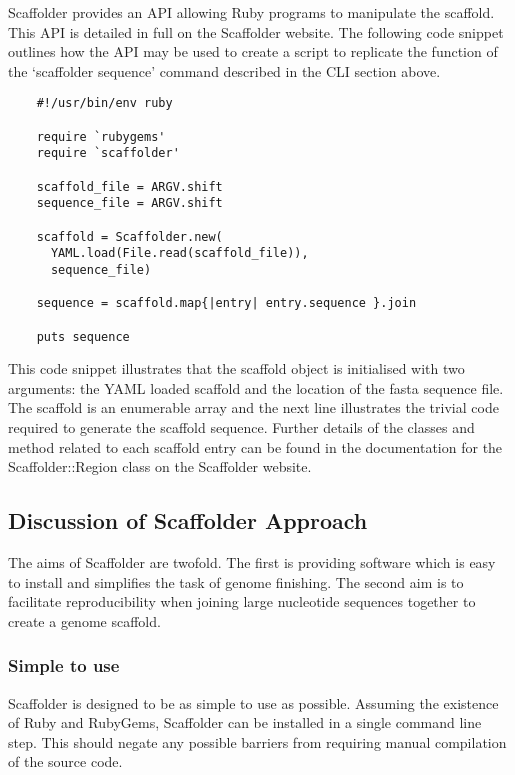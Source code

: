 \documentclass[10pt]{bmc_article}
\newenvironment{bmcformat}{\begin{raggedright}\baselineskip20pt\sloppy\setboolean{publ}{false}}{\end{raggedright}\baselineskip20pt\sloppy}
\begin{document}
\begin{bmcformat}
Scaffolder provides an API allowing Ruby programs to manipulate the scaffold.
This API is detailed in full on the Scaffolder website. The following code
snippet outlines how the API may be used to create a script to replicate the
function of the `scaffolder sequence' command described in the CLI section
above. \pb

  \begin{verbatim}
    #!/usr/bin/env ruby

    require `rubygems'
    require `scaffolder'

    scaffold_file = ARGV.shift
    sequence_file = ARGV.shift

    scaffold = Scaffolder.new(
      YAML.load(File.read(scaffold_file)),
      sequence_file)

    sequence = scaffold.map{|entry| entry.sequence }.join

    puts sequence
  \end{verbatim}

This code snippet illustrates that the scaffold object is initialised with two
arguments: the YAML loaded scaffold and the location of the fasta sequence
file. The scaffold is an enumerable array and the next line illustrates the
trivial code required to generate the scaffold sequence. Further details of
the classes and method related to each scaffold entry can be found in the
documentation for the Scaffolder::Region class on the Scaffolder website. \pb

\subsection*{Discussion of Scaffolder Approach} %

The aims of Scaffolder are twofold. The first is providing software which is
easy to install and simplifies the task of genome finishing. The second aim is
to facilitate reproducibility when joining large nucleotide sequences together
to create a genome scaffold. \pb

\subsubsection*{Simple to use} %

Scaffolder is designed to be as simple to use as possible. Assuming the
existence of Ruby and RubyGems, Scaffolder can be installed in a single
command line step. This should negate any possible barriers from requiring
manual compilation of the source code. \pb


\end{bmcformat}
\end{document}
